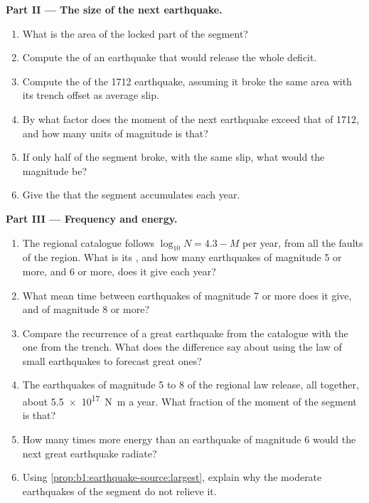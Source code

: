 \begin{problem}
\medskip
\noindent\textbf{Part II --- The size of the next earthquake.}
\begin{enumerate}[resume]
  \item What is the area of the locked part of the segment?
  \item Compute the  of an earthquake that would release the
        whole deficit.
  \item Compute the  of the 1712 earthquake, assuming it broke
        the same area with its trench offset as average slip.
  \item By what factor does the moment of the next earthquake exceed that of
        1712, and how many units of magnitude is that?
  \item If only half of the segment broke, with the same slip, what would the
        magnitude be?
  \item Give the  that the segment accumulates each year.
\end{enumerate}

\medskip
\noindent\textbf{Part III --- Frequency and energy.}
\begin{enumerate}[resume]
  \item The regional catalogue follows $\log_{10} N = 4.3 - M$ per year, from
        all the faults of the region. What is its , and how many
        earthquakes of magnitude 5 or more, and 6 or more, does it give each
        year?
  \item What mean time between earthquakes of magnitude 7 or more does it give,
        and of magnitude 8 or more?
  \item Compare the recurrence of a great earthquake from the catalogue with
        the one from the trench. What does the difference say about using the
        law of small earthquakes to forecast great ones?
  \item The earthquakes of magnitude 5 to 8 of the regional law release, all
        together, about \qty{5.5e17}{N.m} a year. What fraction of the moment
        of the segment is that?
  \item How many times more energy than an earthquake of magnitude 6 would
        the next great earthquake radiate?
  \item Using \cref{prop:b1:earthquake-source:largest}, explain why the
        moderate earthquakes of the segment do not relieve it.
\end{enumerate}


\end{problem}
